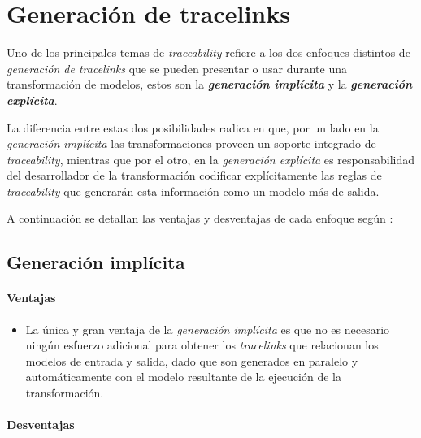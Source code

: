\documentclass[a4paper,12pt,twoside,spanish,openright]{book}
\begin{document}
\section{Generación de tracelinks}
\label{sec:GeneracionTracelinks}

Uno de los principales temas de \textit{traceability} refiere a los dos enfoques distintos de \textit{generación de tracelinks} que se pueden presentar o usar durante una transformación de modelos, estos son la \textit{\textbf{generación implícita}} y la \textit{\textbf{generación explícita}}. 

La diferencia entre estas dos posibilidades radica en que, por un lado en la \textit{generación implícita} las transformaciones proveen un soporte integrado de \textit{traceability}, mientras que por el otro, en la \textit{generación explícita} es responsabilidad del desarrollador de la transformación codificar explícitamente las reglas de \textit{traceability} que generarán esta información como un modelo más de salida.

A continuación se detallan las ventajas y desventajas de cada enfoque según \cite{GrammelVoigt}:


\subsection{Generación implícita}

\paragraph{Ventajas}

\begin{itemize}[label={\checkmark}]

\item La única y gran ventaja de la \textit{generación implícita} es que no es necesario ningún esfuerzo adicional para obtener los \textit{tracelinks} que relacionan los modelos de entrada y salida, dado que son generados en paralelo y automáticamente con el modelo resultante de la ejecución de la transformación.

\end{itemize}

\paragraph{Desventajas}
\end{document}
